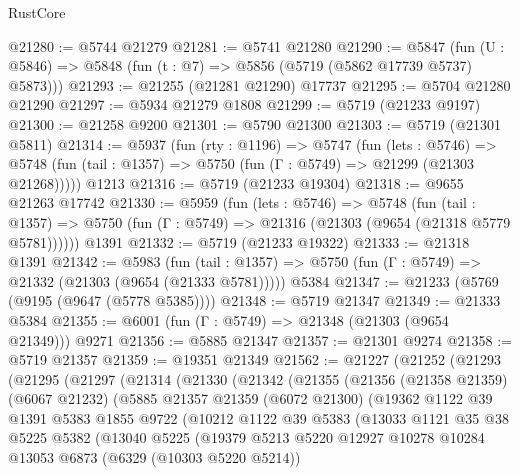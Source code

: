 \begin{lexlean}{RustCore}
\begin{coremodule}
@21280 := @5744 @21279
@21281 := @5741 @21280
@21290 := @5847
    (fun (U : @5846) => @5848 (fun (t : @7) => @5856 (@5719 (@5862 @17739 @5737) @5873)))
@21293 := @21255 (@21281 @21290) @17737
@21295 := @5704 @21280 @21290
@21297 := @5934 @21279 @1808
@21299 := @5719 (@21233 @9197)
@21300 := @21258 @9200
@21301 := @5790 @21300
@21303 := @5719 (@21301 @5811)
@21314 := @5937
    (fun (rty : @1196) =>
    @5747
      (fun (lets : @5746) =>
      @5748 (fun (tail : @1357) => @5750 (fun (Γ : @5749) => @21299 (@21303 @21268)))))
    @1213
@21316 := @5719 (@21233 @19304)
@21318 := @9655 @21263 @17742
@21330 := @5959
    (fun (lets : @5746) =>
    @5748
      (fun (tail : @1357) =>
      @5750 (fun (Γ : @5749) => @21316 (@21303 (@9654 (@21318 @5779 @5781))))))
    @1391
@21332 := @5719 (@21233 @19322)
@21333 := @21318 @1391
@21342 := @5983
    (fun (tail : @1357) => @5750 (fun (Γ : @5749) => @21332 (@21303 (@9654 (@21333 @5781)))))
    @5384
@21347 := @21233 (@5769 (@9195 (@9647 (@5778 @5385))))
@21348 := @5719 @21347
@21349 := @21333 @5384
@21355 := @6001 (fun (Γ : @5749) => @21348 (@21303 (@9654 @21349))) @9271
@21356 := @5885 @21347
@21357 := @21301 @9274
@21358 := @5719 @21357
@21359 := @19351 @21349
@21562 := @21227
    (@21252
      (@21293
        (@21295
          (@21297
            (@21314
              (@21330
                (@21342
                  (@21355
                    (@21356
                      (@21358 @21359)
                      (@6067 @21232)
                      (@5885
                        @21357
                        @21359
                        (@6072 @21300)
                        (@19362
                          @1122
                          @39
                          @1391
                          @5383
                          @1855
                          @9722
                          (@10212
                            @1122
                            @39
                            @5383
                            (@13033
                              @1121
                              @35
                              @38
                              @5225
                              @5382
                              (@13040
                                @5225
                                (@19379
                                  @5213
                                  @5220
                                  @12927
                                  @10278
                                  @10284
                                  @13053
                                  @6873
                                  (@6329 (@10303 @5220 @5214))

\end{coremodule}
\end{lexlean}
